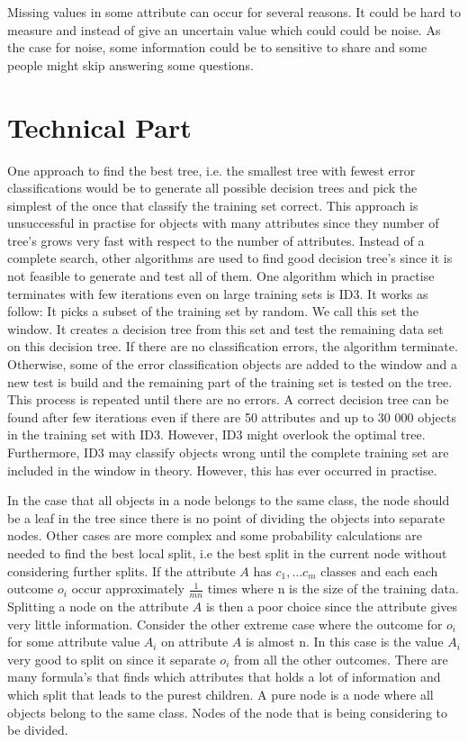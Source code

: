 \documentclass{article}
\begin{document}
Missing values in some attribute can occur for several reasons. It could be hard to measure and instead of give an uncertain value which could could be noise. As the case for noise, some information could be to sensitive to share and some people might skip answering some questions.

\section{Technical Part}
One approach to find the best tree, i.e. the smallest tree with fewest error classifications would be to generate all possible decision trees and pick the simplest of the once that classify the training set correct. This approach is unsuccessful in practise for objects with many attributes since they number of tree's grows very fast with respect to the number of attributes. Instead of a complete search, other algorithms are used to find good decision tree's since it is not feasible to generate and test all of them. One algorithm  which in practise terminates with few iterations even on large training sets is ID3. It works as follow: It picks a subset of the training set by random. We call this set the window. It creates a decision tree from this set and test the remaining data set on this decision tree. If there are no classification errors, the algorithm terminate. Otherwise, some of the error classification objects are added to the window and a new test is build and the remaining part of the training set is tested on the tree. This process is repeated until there are no errors. A correct decision tree can be found after few iterations even if there are 50 attributes and up to 30 000 objects in the training set with ID3. However, ID3 might overlook the optimal tree. Furthermore, ID3 may classify objects wrong until the complete training set are included in the window in theory. However, this has ever occurred in practise\cite{Quinlan1986InductionTrees}.


In the case that all objects in a node belongs to the same class, the node should be a leaf in the tree since there is no point of dividing the objects into separate nodes. Other cases are more complex and some  probability calculations are needed to find the best local split, i.e the best split in the current node without considering further splits. If the attribute $A$ has $c_1,\dots c_m$ classes and each each outcome $o_i$ occur approximately $\frac{1}{mn}$ times where n is the size of the training data. Splitting a node on the attribute $A$ is then a poor choice since the attribute gives very little information. Consider the other extreme case where the outcome for $o_i$ for some attribute value $A_i$ on attribute $A$ is almost n. In this case is the value $A_i$ very good to split on since it separate $o_i$ from all the other outcomes. There are many formula's that finds which attributes that holds a lot of information and which split that leads to the purest children. A pure node is a node where all objects belong to the same class. Nodes of the node that is being considering to be divided. 
\end{document}
